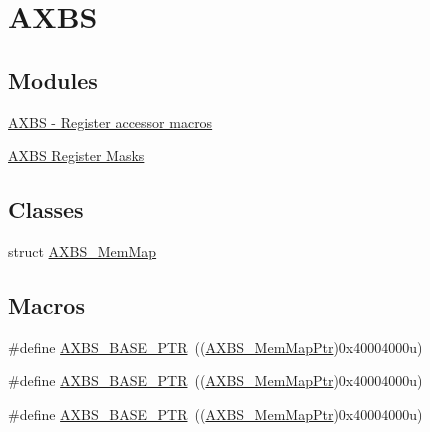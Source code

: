 \hypertarget{group___a_x_b_s___peripheral}{}\section{A\+X\+BS}
\label{group___a_x_b_s___peripheral}
\subsection*{Modules}
\begin{DoxyCompactItemize}
\item 
\hyperlink{group___a_x_b_s___register___accessor___macros}{A\+X\+B\+S -\/ Register accessor macros}
\item 
\hyperlink{group___a_x_b_s___register___masks}{A\+X\+B\+S Register Masks}
\end{DoxyCompactItemize}
\subsection*{Classes}
\begin{DoxyCompactItemize}
\item 
struct \hyperlink{struct_a_x_b_s___mem_map}{A\+X\+B\+S\+\_\+\+Mem\+Map}
\end{DoxyCompactItemize}
\subsection*{Macros}
\begin{DoxyCompactItemize}
\item 
\#define \hyperlink{group___a_x_b_s___peripheral_gacbbf56489b86d1ddb3e0ac291922a56d}{A\+X\+B\+S\+\_\+\+B\+A\+S\+E\+\_\+\+P\+TR}~((\hyperlink{group___a_x_b_s___peripheral_ga8f768bd75d5c94d51b05e9ef4a38ea33}{A\+X\+B\+S\+\_\+\+Mem\+Map\+Ptr})0x40004000u)
\item 
\#define \hyperlink{group___a_x_b_s___peripheral_gacbbf56489b86d1ddb3e0ac291922a56d}{A\+X\+B\+S\+\_\+\+B\+A\+S\+E\+\_\+\+P\+TR}~((\hyperlink{group___a_x_b_s___peripheral_ga8f768bd75d5c94d51b05e9ef4a38ea33}{A\+X\+B\+S\+\_\+\+Mem\+Map\+Ptr})0x40004000u)
\item 
\#define \hyperlink{group___a_x_b_s___peripheral_gacbbf56489b86d1ddb3e0ac291922a56d}{A\+X\+B\+S\+\_\+\+B\+A\+S\+E\+\_\+\+P\+TR}~((\hyperlink{group___a_x_b_s___peripheral_ga8f768bd75d5c94d51b05e9ef4a38ea33}{A\+X\+B\+S\+\_\+\+Mem\+Map\+Ptr})0x40004000u)
\end{DoxyCompactItemize}
